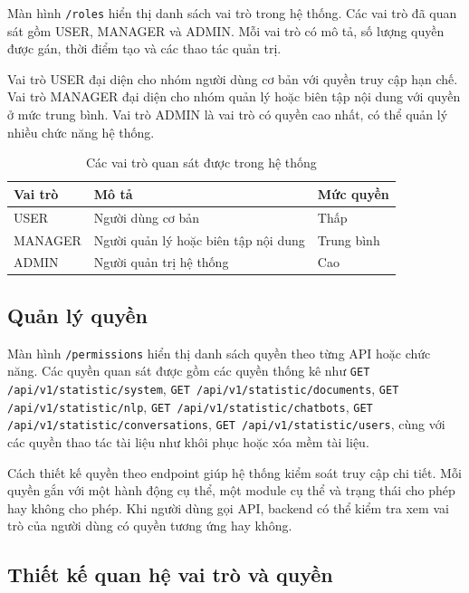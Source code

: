 \documentclass[12pt,a4paper]{report}
\begin{document}
Màn hình \texttt{/roles} hiển thị danh sách vai trò trong hệ thống. Các vai trò đã quan sát gồm USER, MANAGER và ADMIN. Mỗi vai trò có mô tả, số lượng quyền được gán, thời điểm tạo và các thao tác quản trị.

Vai trò USER đại diện cho nhóm người dùng cơ bản với quyền truy cập hạn chế. Vai trò MANAGER đại diện cho nhóm quản lý hoặc biên tập nội dung với quyền ở mức trung bình. Vai trò ADMIN là vai trò có quyền cao nhất, có thể quản lý nhiều chức năng hệ thống.

\begin{table}[H]
\centering
\caption{Các vai trò quan sát được trong hệ thống}
\label{tab:roles-observed}
\begin{tabular}{|p{3cm}|p{6cm}|p{4cm}|}
\hline
\textbf{Vai trò} & \textbf{Mô tả} & \textbf{Mức quyền} \\ \hline
USER & Người dùng cơ bản & Thấp \\ \hline
MANAGER & Người quản lý hoặc biên tập nội dung & Trung bình \\ \hline
ADMIN & Người quản trị hệ thống & Cao \\ \hline
\end{tabular}
\end{table}

\subsection{Quản lý quyền}

Màn hình \texttt{/permissions} hiển thị danh sách quyền theo từng API hoặc chức năng. Các quyền quan sát được gồm các quyền thống kê như \texttt{GET /api/v1/statistic/system}, \texttt{GET /api/v1/statistic/documents}, \texttt{GET /api/v1/statistic/nlp}, \texttt{GET /api/v1/statistic/chatbots}, \texttt{GET /api/v1/statistic/conversations}, \texttt{GET /api/v1/statistic/users}, cùng với các quyền thao tác tài liệu như khôi phục hoặc xóa mềm tài liệu.

Cách thiết kế quyền theo endpoint giúp hệ thống kiểm soát truy cập chi tiết. Mỗi quyền gắn với một hành động cụ thể, một module cụ thể và trạng thái cho phép hay không cho phép. Khi người dùng gọi API, backend có thể kiểm tra xem vai trò của người dùng có quyền tương ứng hay không.

\subsection{Thiết kế quan hệ vai trò và quyền}
\end{document}
